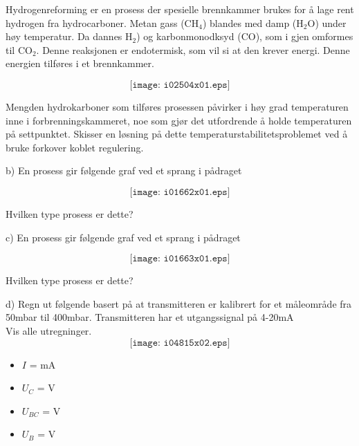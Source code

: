 

Hydrogenreforming er en prosess der spesielle brennkammer brukes for å lage rent hydrogen fra hydrocarboner. Metan gass (CH$_{4}$) blandes med damp (H$_{2}$O) under høy  temperatur. Da dannes H$_{2}$) og karbonmonodksyd (CO), som i gjen omformes til CO$_{2}$. Denne reaksjonen er endotermisk, som vil si at den krever energi. Denne energien tilføres i et brennkammer. 

$$\texttt{[image: i02504x01.eps]}$$

Mengden hydrokarboner som tilføres prosessen påvirker i høy grad temperaturen inne i forbrenningskammeret, noe som gjør det utfordrende å holde temperaturen på settpunktet. Skisser en løsning på dette temperaturstabilitetsproblemet ved å bruke forkover koblet regulering. 



b) En prosess gir følgende graf ved et sprang i pådraget

$$\texttt{[image: i01662x01.eps]}$$

Hvilken type prosess er dette?


c) En prosess gir følgende graf ved et sprang i pådraget

$$\texttt{[image: i01663x01.eps]}$$

Hvilken type prosess er dette?

d) Regn ut følgende basert på at transmitteren er kalibrert for et måleområde fra 50mbar til 400mbar. Transmitteren har et utgangssignal på 4-20mA \\
Vis alle utregninger. \\
$$\texttt{[image: i04815x02.eps]}$$



\begin{itemize}
\item{} $I$ = \underbar{\hskip 50pt} mA
\vskip 10pt
\item{} $U_{C}$ = \underbar{\hskip 50pt} V 
\vskip 10pt
\item{} $U_{BC}$ = \underbar{\hskip 50pt} V 
\vskip 10pt
\item{} $U_{B}$ = \underbar{\hskip 50pt} V 
\end{itemize}

